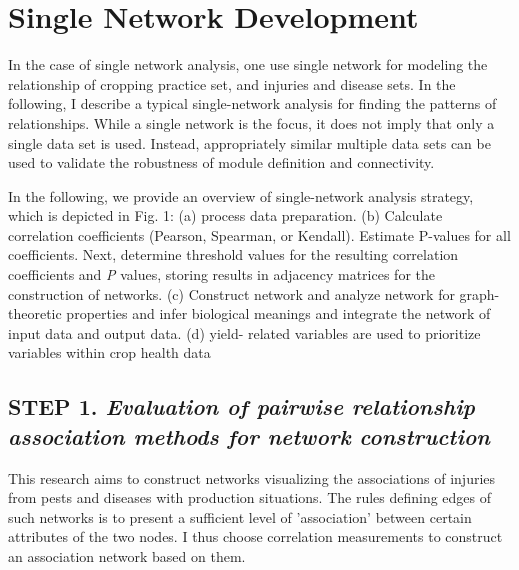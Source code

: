 \section*{Single Network Development}
In the case of single network analysis, one use single network for modeling the relationship of cropping practice set, and injuries and disease sets. In the following, I describe a typical single-network analysis for finding the patterns of relationships.
While a single network is the focus, it does not imply that only a single data set is used. Instead, appropriately similar multiple data sets can be used to validate the robustness of module definition and connectivity.

In the following, we provide an overview of single-network analysis strategy, which is depicted in Fig. 1: (a) process data preparation. (b) Calculate correlation coefficients (Pearson, Spearman, or Kendall). Estimate P-values for all coefficients. Next, determine threshold values for the resulting correlation coefficients and \textit{P} values, storing results in adjacency matrices for the construction of networks. (c) Construct network and analyze network for graph-theoretic properties and infer biological meanings and integrate the network of input data and output data. (d) yield- related variables are used to prioritize variables within crop health data


\subsection*{\textbf{STEP 1. }\textit{Evaluation of pairwise relationship association methods for network construction}}

This research aims to construct networks visualizing the associations of injuries from pests and diseases with production situations. The rules defining edges of such networks is to present a sufficient level of 'association' between certain attributes of the two nodes. I thus choose correlation measurements to construct an association network based on them.


